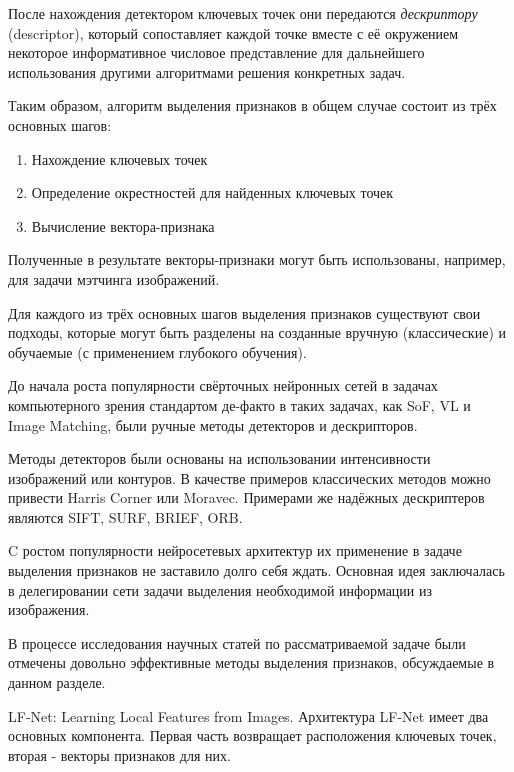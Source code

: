 \documentclass[a4paper]{article}
\begin{document}
После нахождения детектором ключевых точек они передаются \textit{дескриптору} (descriptor), который сопоставляет каждой точке вместе с её окружением некоторое информативное числовое представление для дальнейшего использования другими алгоритмами решения конкретных задач.




Таким образом, алгоритм выделения признаков в общем случае состоит из трёх основных шагов:
\begin{enumerate}
    \item Нахождение ключевых точек
    \item Определение окрестностей для найденных ключевых точек
    \item Вычисление вектора-признака
\end{enumerate}


Полученные в результате векторы-признаки могут быть использованы, например, для задачи мэтчинга изображений. 


 Для каждого из трёх основных шагов выделения признаков существуют свои подходы, которые могут быть разделены на созданные вручную (классические) и обучаемые (с применением глубокого обучения).


 До начала роста популярности свёрточных нейронных сетей в задачах компьютерного зрения стандартом де-факто в таких задачах, как SoF, VL и Image Matching, были ручные методы детекторов и дескрипторов.


Методы детекторов были основаны на использовании интенсивности изображений или контуров. В качестве примеров классических методов можно привести Harris Corner или Moravec. Примерами же надёжных дескриптеров являются SIFT, SURF, BRIEF, ORB.


 C ростом популярности нейросетевых архитектур их применение в задаче выделения признаков не заставило долго себя ждать. Основная идея заключалась в делегировании сети задачи выделения необходимой информации из изображения.


 В процессе исследования научных статей по рассматриваемой задаче были отмечены довольно эффективные методы выделения признаков, обсуждаемые в данном разделе.


 LF-Net: Learning Local Features from Images. Архитектура LF-Net имеет два основных компонента. Первая часть возвращает расположения ключевых точек, вторая - векторы признаков для них. 
\end{document}
